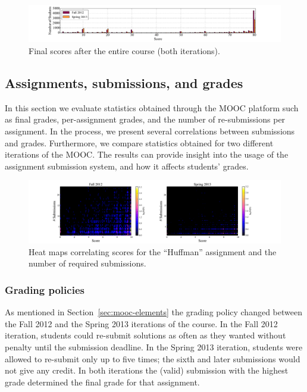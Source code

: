 \documentclass{sig-alternate}
\begin{document}
\begin{figure}[ht!]
  \centering
  \includegraphics[width=\textwidth]{plots/final-scores.pdf}
  \caption{Final scores after the entire course (both iterations).}
  \label{fig:final-scores}
\end{figure}

\subsection{Assignments, submissions, and grades}

In this section we evaluate statistics obtained through the MOOC platform such
as final grades, per-assignment grades, and the number of re-submissions per
assignment. In the process, we present several correlations between
submissions and grades. Furthermore, we compare statistics obtained for two
different iterations of the MOOC. The results can provide insight into the
usage of the assignment submission system, and how it affects students'
grades.


\begin{figure}[ht!]
  \centering
  \includegraphics[width=\textwidth]{plots/score-2d-histogram-fall2012-spring2013.pdf}
  \caption{Heat maps correlating scores for the ``Huffman'' assignment and the number 
  of required submissions.}
  \label{fig:2d-histogram}
\end{figure}

\subsubsection{Grading policies}\label{sec:grading-policies}

As mentioned in Section~\ref{sec:mooc-elements} the grading policy changed
between the Fall 2012 and the Spring 2013 iterations of the course. In the
Fall 2012 iteration, students could re-submit solutions as often as they
wanted without penalty until the submission deadline. In the Spring 2013
iteration, students were allowed to re-submit only up to five times; the sixth
and later submissions would not give any credit. In both iterations the
(valid) submission with the highest grade determined the final grade for that
assignment.
\end{document}
